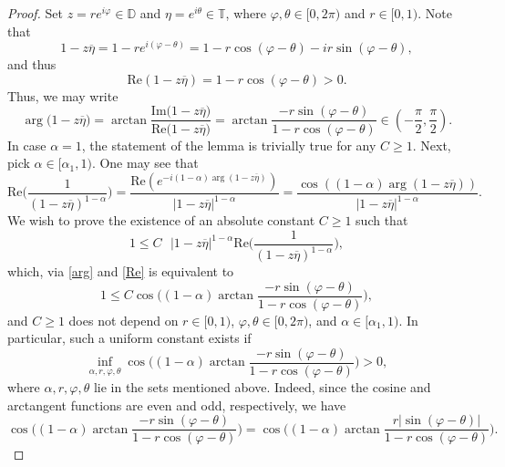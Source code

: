 \documentclass[10pt,a4paper]{amsart}
\newcommand\DD{{\mathbb D}}
\newcommand\TT{{\mathbb T}}
\begin{document}
\begin{proof}
Set $z=re^{i\varphi}\in\DD$ and $\eta=e^{i\theta}\in \TT$, where $\varphi,\theta\in [0,2\pi)$ and $r\in[0,1)$. Note that
\begin{equation*}
1-z\overline{\eta}=1-re^{i(\varphi-\theta)}=1-r\cos(\varphi-\theta)-ir\sin(\varphi-\theta),
\end{equation*}
and thus
\begin{equation*}
  \mathrm{Re}(1-z\overline{\eta})=1-r\cos(\varphi-\theta)>0.  
\end{equation*}
Thus, we may write
\begin{equation}\label{arg}
\arg{(1-z\overline{\eta}})=\arctan\frac{\mathrm{Im}{(1-z\overline{\eta}})}{\mathrm{Re}{(1-z\overline{\eta}})}=\arctan\frac{-r\sin(\varphi-\theta)}{1-r\cos(\varphi-\theta)}\in\left(-\frac{\pi}{2},\frac{\pi}{2}\right).
\end{equation}
In case $\alpha=1$, the statement of the lemma is trivially true for any $C\ge1$. Next, pick $\alpha\in [\alpha_1,1)$. One may see that
\begin{equation}\label{Re}
\mathrm{Re}\Big(\frac{1}{(1-z\overline{\eta})^{1-\alpha}}\Big)=\frac{\mathrm{Re}(e^{-i(1-\alpha)\arg(1-z\overline{\eta})})}{|1-z\overline{\eta}|^{1-\alpha}}=\frac{\cos((1-\alpha)\arg(1-z\overline{\eta}))}{|1-z\overline{\eta}|^{1-\alpha}}.
\end{equation}
We wish to prove the existence of an absolute constant $C\ge1$ such that 
\begin{equation*}
   1\leq C \text{ }|1-z\overline{\eta}|^{1-\alpha}\mathrm{Re}\Big(\frac{1}{(1-z\overline{\eta})^{1-\alpha}}\Big), 
\end{equation*}
which, via \eqref{arg} and \eqref{Re} is equivalent to
\begin{equation*}
1\leq C\cos{\Big((1-\alpha) \arctan\frac{-r\sin(\varphi-\theta)}{1-r\cos(\varphi-\theta)}\Big)},
\end{equation*}
and $C\ge1$ does not depend on $r\in [0,1)$, $\varphi,\theta\in [0,2\pi)$, and $\alpha\in [\alpha_1,1)$. In particular, such a uniform constant exists if
\begin{equation}
\inf_{\alpha,r, \varphi,\theta}{\cos{\Big((1-\alpha) \arctan\frac{-r\sin(\varphi-\theta)}{1-r\cos(\varphi-\theta)}\Big)}}>0,
\end{equation}
where $ \alpha,r, \varphi,\theta$ lie in the sets mentioned above. Indeed, since the cosine and arctangent functions are even and odd, respectively, we have
\begin{equation*}
\cos{\Big((1-\alpha) \arctan\frac{-r\sin(\varphi-\theta)}{1-r\cos(\varphi-\theta)}\Big)}=\cos{\Big((1-\alpha) \arctan\frac{r|\sin(\varphi-\theta)|}{1-r\cos(\varphi-\theta)}\Big)}.

\end{equation*}
\end{proof}
\end{document}
